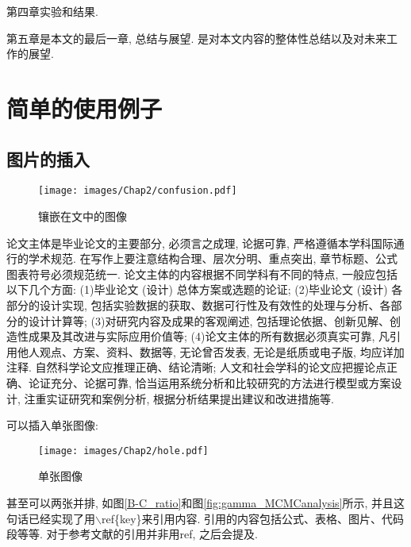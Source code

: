 \documentclass[a4paper]{article}
\begin{document}
第四章实验和结果.

第五章是本文的最后一章, 总结与展望. 是对本文内容的整体性总结以及对未来工作的展望.

\pagebreak[4]

\section{简单的使用例子}
\label{cha:example}
\subsection{图片的插入}
\label{sec:Images}
\begin{wrapfigure}{r}{0.5\linewidth}
\centering
\texttt{[image: images/Chap2/confusion.pdf]} %
\caption{镶嵌在文中的图像}
\label{fig:confusion}
\end{wrapfigure}
论文主体是毕业论文的主要部分, 必须言之成理, 论据可靠, 严格遵循本学科国际通行的学术规范. 在写作上要注意结构合理、层次分明、重点突出, 章节标题、公式图表符号必须规范统一. 论文主体的内容根据不同学科有不同的特点, 一般应包括以下几个方面: (1)毕业论文 (设计) 总体方案或选题的论证; (2)毕业论文 (设计) 各部分的设计实现, 包括实验数据的获取、数据可行性及有效性的处理与分析、各部分的设计计算等; (3)对研究内容及成果的客观阐述, 包括理论依据、创新见解、创造性成果及其改进与实际应用价值等; (4)论文主体的所有数据必须真实可靠, 凡引用他人观点、方案、资料、数据等, 无论曾否发表, 无论是纸质或电子版, 均应详加注释. 自然科学论文应推理正确、结论清晰; 人文和社会学科的论文应把握论点正确、论证充分、论据可靠, 恰当运用系统分析和比较研究的方法进行模型或方案设计, 注重实证研究和案例分析, 根据分析结果提出建议和改进措施等.

可以插入单张图像:
\begin{figure}[h]
\centering
\texttt{[image: images/Chap2/hole.pdf]}
\caption{单张图像}
\label{fig:hole}
\end{figure}

甚至可以两张并排, 如图\ref{B-C_ratio}和图\ref{fig:gamma_MCMCanalysis}所示, 并且这句话已经实现了用$\backslash$ref\{key\}来引用内容. 引用的内容包括公式、表格、图片、代码段等等. 对于参考文献的引用并非用ref, 之后会提及.
\end{document}
